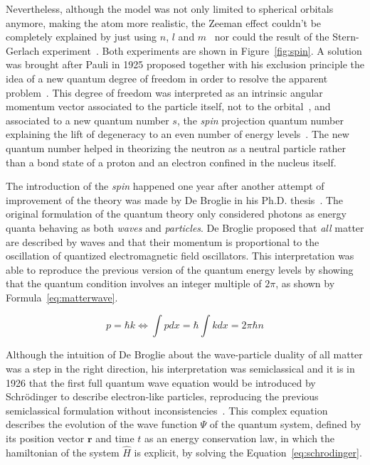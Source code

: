 	Nevertheless, although the model was not only limited to spherical orbitals anymore, making the atom more realistic, the Zeeman effect couldn't be completely explained by just using $n$, $l$ and $m$~\cite{ZEEMAN431897,ZEEMAN441897I,ZEEMAN441897II,ZEEMAN451898} nor could the result of the Stern-Gerlach experiment~\cite{GERLACH1922}. Both experiments are shown in Figure~\ref{fig:spin}. A solution was brought after Pauli in 1925 proposed together with his exclusion principle the idea of a new quantum degree of freedom in order to resolve the apparent problem~\cite{PAULI1925I,PAULI1925II}. This degree of freedom was interpreted as an intrinsic angular momentum vector associated to the particle itself, not to the orbital~\cite{UHLENBECK1926}, and associated to a new quantum number $s$, the \textit{spin} projection quantum number explaining the lift of degeneracy to an even number of energy levels~\cite{PAULI1927}. The new quantum number helped in theorizing the neutron as a neutral particle rather than a bond state of a proton and an electron confined in the nucleus itself.
	
	The introduction of the \textit{spin} happened one year after another attempt of improvement of the theory was made by De Broglie in his Ph.D. thesis~\cite{DEBROGLIE1924}. The original formulation of the quantum theory only considered photons as energy quanta behaving as both \textit{waves} and \textit{particles}. De Broglie proposed that \textit{all} matter are described by waves and that their momentum is proportional to the oscillation of quantized electromagnetic field oscillators. This interpretation was able to reproduce the previous version of the quantum energy levels by showing that the quantum condition involves an integer multiple of $2\pi$, as shown by Formula~\ref{eq:matterwave}.
	
	\begin{equation}
		\label{eq:matterwave}
		p = \hbar k \Leftrightarrow \int p dx = \hbar\int k dx = 2\pi\hbar n
	\end{equation}
	
	Although the intuition of De Broglie about the wave-particle duality of all matter was a step in the right direction, his interpretation was semiclassical and it is in 1926 that the first full quantum wave equation would be introduced by Schrödinger to describe electron-like particles, reproducing the previous semiclassical formulation without inconsistencies~\cite{SCHRODINGER1926}. This complex equation describes the evolution of the wave function $\Psi$ of the quantum system, defined by its position vector $\mathbf{r}$ and time $t$ as an energy conservation law, in which the hamiltonian of the system $\hat{H}$ is explicit, by solving the Equation~\ref{eq:schrodinger}.
	
